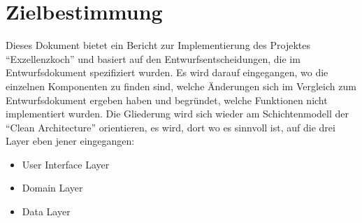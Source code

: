 \chapter{Zielbestimmung}

Dieses Dokument bietet ein Bericht zur Implementierung des Projektes "`Exzellenzkoch"' und basiert auf den Entwurfsentscheidungen, die im Entwurfsdokument spezifiziert wurden. 
Es wird darauf eingegangen, wo die einzelnen Komponenten zu finden sind, welche Änderungen sich im Vergleich zum Entwurfsdokument ergeben haben und begründet, welche Funktionen nicht implementiert wurden.
Die Gliederung wird sich wieder am Schichtenmodell der "`Clean Architecture"' orientieren, es wird, dort wo es sinnvoll ist, auf die drei Layer eben jener eingegangen: 
\begin{itemize}
	\item User Interface Layer
	\item Domain Layer
	\item Data Layer
\end{itemize}